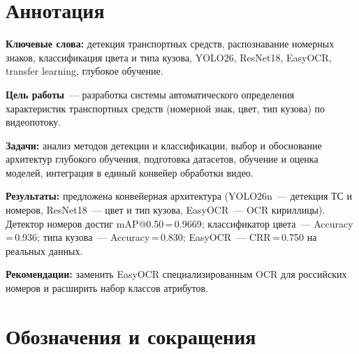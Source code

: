 \documentclass[10pt,a4paper]{report}
\numberwithin{equation}{chapter}
\numberwithin{figure}{chapter}
\numberwithin{table}{chapter}
\begin{document}

\setcounter{page}{1}   %

\chapter*{Аннотация}

\noindent\textbf{Ключевые слова:} детекция транспортных средств, распознавание
номерных знаков, классификация цвета и типа кузова, YOLO26, ResNet18,
EasyOCR, transfer learning, глубокое обучение.

\textbf{Цель работы}~--- разработка системы автоматического определения
характеристик транспортных средств (номерной знак, цвет, тип кузова) по
видеопотоку.

\textbf{Задачи:} анализ методов детекции и классификации, выбор и обоснование
архитектур глубокого обучения, подготовка датасетов, обучение и оценка
моделей, интеграция в единый конвейер обработки видео.

\textbf{Результаты:} предложена конвейерная архитектура (YOLO26n~--- детекция
ТС и номеров, ResNet18~--- цвет и тип кузова, EasyOCR~--- OCR кириллицы).
Детектор номеров достиг mAP@0.50\,=\,0.9669; классификатор цвета~---
Accuracy\,=\,0.936; типа кузова~--- Accuracy\,=\,0.830;
EasyOCR~--- CRR\,=\,0.750 на реальных данных.

\textbf{Рекомендации:} заменить EasyOCR специализированным OCR для российских
номеров и расширить набор классов атрибутов.

\tableofcontents

\chapter*{Обозначения и сокращения}
\end{document}

